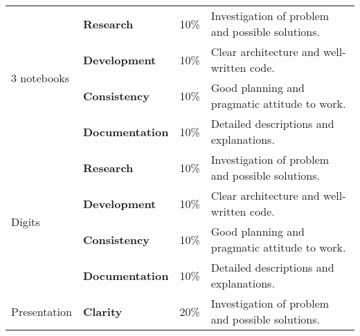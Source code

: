 \documentclass[12pt, a4paper]{article}
\begin{document}
\begin{center}
  \begin{tabular}{lllp{6.4cm}}
    \toprule
    \multirow{4}{*}{3 notebooks} & \textbf{Research} & 10\% & Investigation of problem and possible solutions. \\
    & \textbf{Development} & 10\% & Clear architecture and well-written code. \\
    & \textbf{Consistency} & 10\% & Good planning and pragmatic attitude to work. \\
    & \textbf{Documentation} & 10\% & Detailed descriptions and explanations. \\
    \midrule
    \multirow{4}{*}{Digits} & \textbf{Research} & 10\% & Investigation of problem and possible solutions. \\
    & \textbf{Development} & 10\% & Clear architecture and well-written code. \\
    & \textbf{Consistency} & 10\% & Good planning and pragmatic attitude to work. \\
    & \textbf{Documentation} & 10\% & Detailed descriptions and explanations. \\
    \midrule
    Presentation & \textbf{Clarity} & 20\% & Investigation of problem and possible solutions. \\
    \midrule
    \bottomrule
  \end{tabular}
\end{center}
\end{document}
